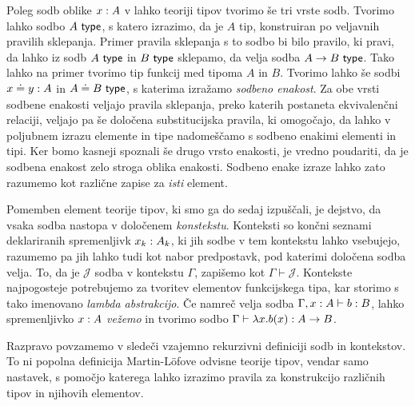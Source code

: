 Poleg sodb oblike \({x : A}\) v lahko teoriji tipov tvorimo še tri vrste sodb.
Tvorimo lahko sodbo \(A\ \textnormal{\textsf{type}}\), s katero izrazimo, da je \(A\) tip, konstruiran po veljavnih pravilih sklepanja.
Primer pravila sklepanja s to sodbo bi bilo pravilo, ki pravi, da lahko iz sodb \(A\ \textnormal{\textsf{type}}\) in \(B\ \textnormal{\textsf{type}}\) sklepamo, da velja sodba \(A \to B\ \textnormal{\textsf{type}}\). Tako lahko na primer tvorimo tip funkcij med tipoma \(A\) in \(B\).
Tvorimo lahko še sodbi \({x \doteq y : A}\) in \(A \doteq B\ \textnormal{\textsf{type}}\),
s katerima izražamo \emph{sodbeno enakost}. Za obe vrsti sodbene enakosti veljajo pravila
sklepanja, preko katerih postaneta ekvivalenčni relaciji,
veljajo pa še določena substitucijska
pravila, ki omogočajo, da lahko v poljubnem izrazu elemente in tipe nadomeščamo s sodbeno
enakimi elementi in tipi. Ker bomo kasneji spoznali še drugo vrsto enakosti, je vredno
poudariti, da je sodbena enakost zelo stroga oblika enakosti. Sodbeno enake izraze lahko
zato razumemo kot različne zapise za \emph{isti} element.

Pomemben element teorije tipov, ki smo ga do sedaj izpuščali, je dejstvo,
da vsaka sodba nastopa v določenem \emph{konstekstu}. Konteksti so končni seznami
deklariranih spremenljivk \({x_k : A_{k}}\), ki jih sodbe v tem kontekstu
lahko vsebujejo, razumemo pa jih lahko tudi kot nabor predpostavk, pod katerimi določena
sodba velja.  To, da je \(\mathcal{J}\) sodba v kontekstu \(\Gamma\), zapišemo kot \(\Gamma \vdash \mathcal{J}\).
Kontekste najpogosteje potrebujemo za tvoritev elementov funkcijskega tipa, kar storimo s tako imenovano \emph{lambda abstrakcijo}. Če namreč velja sodba \(\Gamma, {x : A} \vdash {b : B}\), lahko spremenljivko \({x : A}\) \emph{vežemo} in tvorimo sodbo \(\Gamma \vdash {\lambda x.b(x) : A \to B}\).

Razpravo povzamemo v sledeči vzajemno rekurzivni definiciji sodb in kontekstov. To ni popolna definicija Martin-Löfove odvisne teorije tipov, vendar samo nastavek, s pomočjo katerega lahko izrazimo pravila za konstrukcijo različnih tipov in njihovih elementov.


